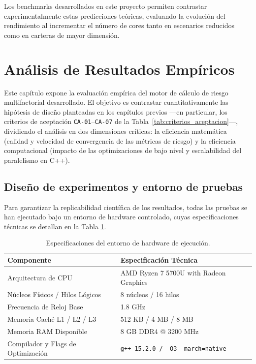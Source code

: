 \documentclass[11pt]{article}
\begin{document}
Los benchmarks desarrollados en este proyecto permiten contrastar experimentalmente estas predicciones teóricas, evaluando la evolución del rendimiento al incrementar el número de cores tanto en escenarios reducidos como en carteras de mayor dimensión.



\section{Análisis de Resultados Empíricos}




Este capítulo expone la evaluación empírica del motor de cálculo de riesgo multifactorial desarrollado. El objetivo es contrastar cuantitativamente las hipótesis de diseño planteadas en los capítulos previos ---en particular, los criterios de aceptación \texttt{CA-01}--\texttt{CA-07} de la Tabla~\ref{tab:criterios_aceptacion}---, dividiendo el análisis en dos dimensiones críticas: la eficiencia matemática (calidad y velocidad de convergencia de las métricas de riesgo) y la eficiencia computacional (impacto de las optimizaciones de bajo nivel y escalabilidad del paralelismo en C++).

\subsection{Diseño de experimentos y entorno de pruebas}

Para garantizar la replicabilidad científica de los resultados, todas las pruebas se han ejecutado bajo un entorno de hardware controlado, cuyas especificaciones técnicas se detallan en la Tabla \ref{tab:hardware}.

\begin{table}[H]
    \centering
    \begin{tabular}{ll}
        \hline
        \textbf{Componente} & \textbf{Especificación Técnica} \\ \hline
        Arquitectura de CPU & AMD Ryzen 7 5700U with Radeon Graphics \\
        Núcleos Físicos / Hilos Lógicos & 8 núcleos / 16 hilos \\
        Frecuencia de Reloj Base & 1.8 GHz \\
        Memoria Caché L1 / L2 / L3 & 512 KB / 4 MB / 8 MB \\
        Memoria RAM Disponible & 8 GB DDR4 @ 3200 MHz \\
        Compilador y Flags de Optimización & \texttt{g++ 15.2.0 / -O3 -march=native} \\ \hline
    \end{tabular}
    \caption{Especificaciones del entorno de hardware de ejecución.}
    \label{tab:hardware}
\end{table}
\end{document}
